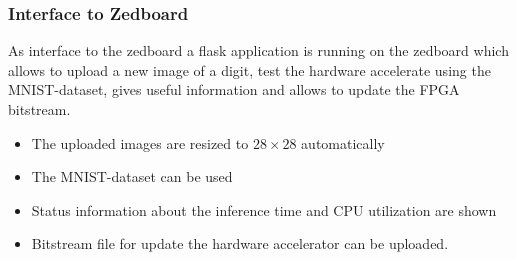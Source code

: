 \subsubsection{Interface to Zedboard} \label{subsec:InterfaceRemoteZed}
As interface to the zedboard a flask application is running on the zedboard which allows to upload a new image of a digit, test the hardware accelerate using the MNIST-dataset, gives useful information and allows to update the FPGA bitstream. 

\begin{itemize}
	\item The uploaded images are resized to $28 \times 28$ automatically
	\item The MNIST-dataset can be used
	\item Status information about the inference time and CPU utilization are shown
	\item Bitstream file for update the hardware accelerator can be uploaded. 
\end{itemize}


